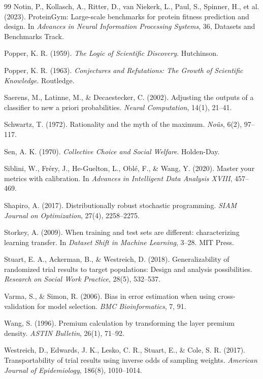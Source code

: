 \documentclass[11pt]{article}
\theoremstyle{remark}
\begin{document}
\begin{thebibliography}{99}
Notin, P., Kollasch, A., Ritter, D., van Niekerk, L., Paul, S., Spinner, H., et al. (2023).
ProteinGym: Large-scale benchmarks for protein fitness prediction and design.
In \emph{Advances in Neural Information Processing Systems}, 36, Datasets and Benchmarks Track.

Popper, K. R. (1959).
\emph{The Logic of Scientific Discovery}.
Hutchinson.

Popper, K. R. (1963).
\emph{Conjectures and Refutations: The Growth of Scientific Knowledge}.
Routledge.

Saerens, M., Latinne, M., \& Decaestecker, C. (2002).
Adjusting the outputs of a classifier to new a priori probabilities.
\emph{Neural Computation}, 14(1), 21--41.

Schwartz, T. (1972).
Rationality and the myth of the maximum.
\emph{No\^us}, 6(2), 97--117.

Sen, A. K. (1970).
\emph{Collective Choice and Social Welfare}.
Holden-Day.

Siblini, W., Fr\'ery, J., He-Guelton, L., Obl\'e, F., \& Wang, Y. (2020).
Master your metrics with calibration.
In \emph{Advances in Intelligent Data Analysis XVIII}, 457--469.

Shapiro, A. (2017).
Distributionally robust stochastic programming.
\emph{SIAM Journal on Optimization}, 27(4), 2258--2275.

Storkey, A. (2009).
When training and test sets are different: characterizing learning transfer.
In \emph{Dataset Shift in Machine Learning}, 3--28. MIT Press.

Stuart, E. A., Ackerman, B., \& Westreich, D. (2018).
Generalizability of randomized trial results to target populations: Design and
analysis possibilities.
\emph{Research on Social Work Practice}, 28(5), 532--537.

Varma, S., \& Simon, R. (2006).
Bias in error estimation when using cross-validation for model selection.
\emph{BMC Bioinformatics}, 7, 91.

Wang, S. (1996).
Premium calculation by transforming the layer premium density.
\emph{ASTIN Bulletin}, 26(1), 71--92.

Westreich, D., Edwards, J. K., Lesko, C. R., Stuart, E., \& Cole, S. R. (2017).
Transportability of trial results using inverse odds of sampling weights.
\emph{American Journal of Epidemiology}, 186(8), 1010--1014.


\end{thebibliography}
\end{document}
